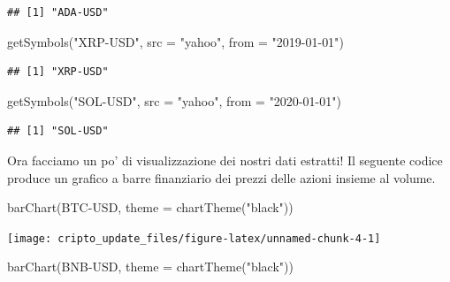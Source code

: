 \documentclass[]{tufte-handout}
\newenvironment{Shaded}{}{}
\newcommand{\AttributeTok}[1]{\textcolor[rgb]{0.49,0.56,0.16}{#1}}
\newcommand{\FunctionTok}[1]{\textcolor[rgb]{0.02,0.16,0.49}{#1}}
\newcommand{\NormalTok}[1]{#1}
\newcommand{\StringTok}[1]{\textcolor[rgb]{0.25,0.44,0.63}{#1}}
\begin{document}
\begin{verbatim}
## [1] "ADA-USD"
\end{verbatim}

\begin{Shaded}
\begin{Highlighting}[]
\FunctionTok{getSymbols}\NormalTok{(}\StringTok{"XRP{-}USD"}\NormalTok{, }\AttributeTok{src =} \StringTok{"yahoo"}\NormalTok{, }\AttributeTok{from =} \StringTok{"2019{-}01{-}01"}\NormalTok{)}
\end{Highlighting}
\end{Shaded}

\begin{verbatim}
## [1] "XRP-USD"
\end{verbatim}

\begin{Shaded}
\begin{Highlighting}[]
\FunctionTok{getSymbols}\NormalTok{(}\StringTok{"SOL{-}USD"}\NormalTok{, }\AttributeTok{src =} \StringTok{"yahoo"}\NormalTok{, }\AttributeTok{from =} \StringTok{"2020{-}01{-}01"}\NormalTok{)}
\end{Highlighting}
\end{Shaded}

\begin{verbatim}
## [1] "SOL-USD"
\end{verbatim}

Ora facciamo un po' di visualizzazione dei nostri dati estratti! Il
seguente codice produce un grafico a barre finanziario dei prezzi delle
azioni insieme al volume.

\begin{Shaded}
\begin{Highlighting}[]
\FunctionTok{barChart}\NormalTok{(}\StringTok{\textasciigrave{}}\AttributeTok{BTC{-}USD}\StringTok{\textasciigrave{}}\NormalTok{, }\AttributeTok{theme =} \FunctionTok{chartTheme}\NormalTok{(}\StringTok{"black"}\NormalTok{))}
\end{Highlighting}
\end{Shaded}

\texttt{[image: cripto\_update\_files/figure-latex/unnamed-chunk-4-1]}

\begin{Shaded}
\begin{Highlighting}[]
\FunctionTok{barChart}\NormalTok{(}\StringTok{\textasciigrave{}}\AttributeTok{BNB{-}USD}\StringTok{\textasciigrave{}}\NormalTok{, }\AttributeTok{theme =} \FunctionTok{chartTheme}\NormalTok{(}\StringTok{"black"}\NormalTok{))}
\end{Highlighting}
\end{Shaded}
\end{document}
